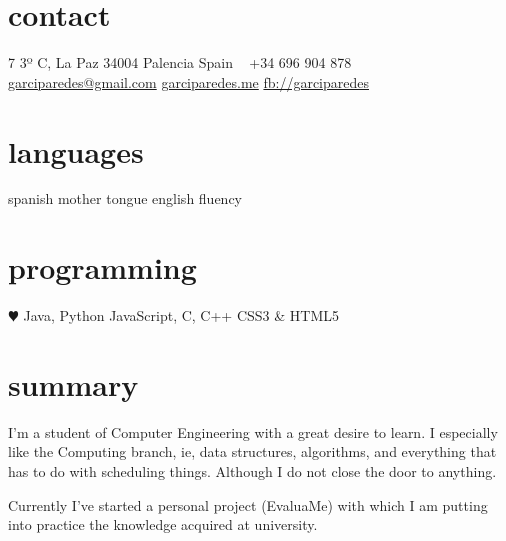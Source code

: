 \documentclass[]{friggeri-cv} %
\begin{document}


\begin{aside} %
\section{contact}
7 3º C, La Paz
34004 Palencia
Spain
~
+34 696 904 878
~
\href{mailto:garciparedes@gmail.com}{garciparedes@gmail.com}
\href{http://garciparedes.me}{garciparedes.me}
\href{http://facebook.com/garciparedes}{fb://garciparedes}
\section{languages}
spanish mother tongue
english fluency
\section{programming}
{\color{red} $\varheartsuit$}  Java, Python
JavaScript, C, C++
CSS3 \& HTML5
\end{aside}


\section{summary}



I'm a student of Computer Engineering with a great desire to learn. I especially like the Computing branch, ie, data structures, algorithms, and everything that has to do with scheduling things. Although I do not close the door to anything. 

Currently I've started a personal project (EvaluaMe) with which I am putting into practice the knowledge acquired at university.



\end{document}
